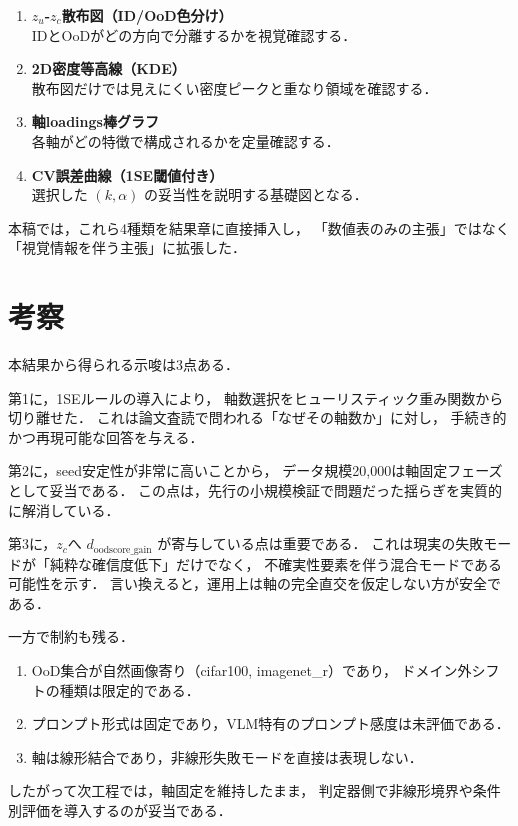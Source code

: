 \documentclass[11pt,a4paper]{article}
\begin{document}
\begin{enumerate}
  \item \textbf{$z_u$-$z_c$散布図（ID/OoD色分け）}\\
  IDとOoDがどの方向で分離するかを視覚確認する．

  \item \textbf{2D密度等高線（KDE）}\\
  散布図だけでは見えにくい密度ピークと重なり領域を確認する．

  \item \textbf{軸loadings棒グラフ}\\
  各軸がどの特徴で構成されるかを定量確認する．

  \item \textbf{CV誤差曲線（1SE閾値付き）}\\
  選択した $(k,\alpha)$ の妥当性を説明する基礎図となる．
\end{enumerate}
本稿では，これら4種類を結果章に直接挿入し，
「数値表のみの主張」ではなく「視覚情報を伴う主張」に拡張した．

\section{考察}
本結果から得られる示唆は3点ある．

第1に，1SEルールの導入により，
軸数選択をヒューリスティック重み関数から切り離せた．
これは論文査読で問われる「なぜその軸数か」に対し，
手続き的かつ再現可能な回答を与える．

第2に，seed安定性が非常に高いことから，
データ規模20,000は軸固定フェーズとして妥当である．
この点は，先行の小規模検証で問題だった揺らぎを実質的に解消している．

第3に，$z_c$へ $d_{\mathrm{oodscore\_gain}}$ が寄与している点は重要である．
これは現実の失敗モードが「純粋な確信度低下」だけでなく，
不確実性要素を伴う混合モードである可能性を示す．
言い換えると，運用上は軸の完全直交を仮定しない方が安全である．

一方で制約も残る．
\begin{enumerate}
  \item OoD集合が自然画像寄り（cifar100, imagenet\_r）であり，
  ドメイン外シフトの種類は限定的である．
  \item プロンプト形式は固定であり，VLM特有のプロンプト感度は未評価である．
  \item 軸は線形結合であり，非線形失敗モードを直接は表現しない．
\end{enumerate}

したがって次工程では，軸固定を維持したまま，
判定器側で非線形境界や条件別評価を導入するのが妥当である．
\end{document}
